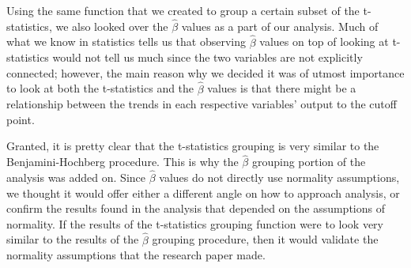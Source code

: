 \par Using the same function that we created to group a certain subset of the 
t-statistics, we also looked over the $\hat{\beta}$ values as a part of our 
analysis. Much of what we know in statistics tells us that observing 
$\hat{\beta}$ values on top of looking at t-statistics would not tell us much 
since the two variables are not explicitly connected; however, the main reason 
why we decided it was of utmost importance to look at both the t-statistics 
and the $\hat{\beta}$ values is that there might be a relationship between the 
trends in each respective variables' output to the cutoff point. 

\par Granted, it is pretty clear that the t-statistics grouping is very similar
to the Benjamini-Hochberg procedure. This is why the $\hat{\beta}$ grouping 
portion of the analysis was added on. Since $\hat{\beta}$ values do not 
directly use normality assumptions, we thought it would offer either a 
different angle on how to approach analysis, or confirm the results found in 
the analysis that depended on the assumptions of normality. If the results of
the t-statistics grouping function were to look very similar to the results of
the $\hat{\beta}$ grouping procedure, then it would validate the normality 
assumptions that the research paper made. 